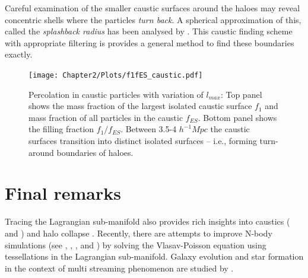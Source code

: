 Careful examination of the smaller caustic surfaces around the haloes may reveal concentric shells where the particles {\it turn back}. A spherical approximation of this, called the {\it splashback radius} has been analysed by \cite{More2015}. This caustic finding scheme with appropriate filtering is provides a general method to find these boundaries exactly.  

\begin{figure} 
\centering\texttt{[image: Chapter2/Plots/f1fES\_caustic.pdf]} 
\caption{Percolation in caustic particles with variation of $l_{max}$: Top panel shows the mass fraction of the largest isolated caustic surface $f_1$ and mass fraction of all particles in the caustic $f_{ES}$. Bottom panel shows the filling fraction $f_1/f_{ES}$. Between 3.5-4 $h^{-1} Mpc$ the caustic surfaces transition into distinct isolated surfaces -- i.e., forming turn-around boundaries of haloes. }
\label{fig:f1fES}
\end{figure}





\section{Final remarks}


Tracing the Lagrangian sub-manifold also provides rich insights into caustics (\cite{Arnold1982} and \citealt{Hidding2014}) and halo collapse \cite{Neyrinck2016}. Recently, there are attempts to improve N-body simulations (see \cite{Hahn2013}, \cite{Angulo2013a}, \cite{Angulo2013b}, \cite{Sousbie2015} and \cite{Hahn2016a}) by solving the Vlasav-Poisson equation using tessellations in the Lagrangian sub-manifold. Galaxy evolution and star formation in the context of multi streaming phenomenon are studied by \cite{Aragon-Calvo2016}. 
